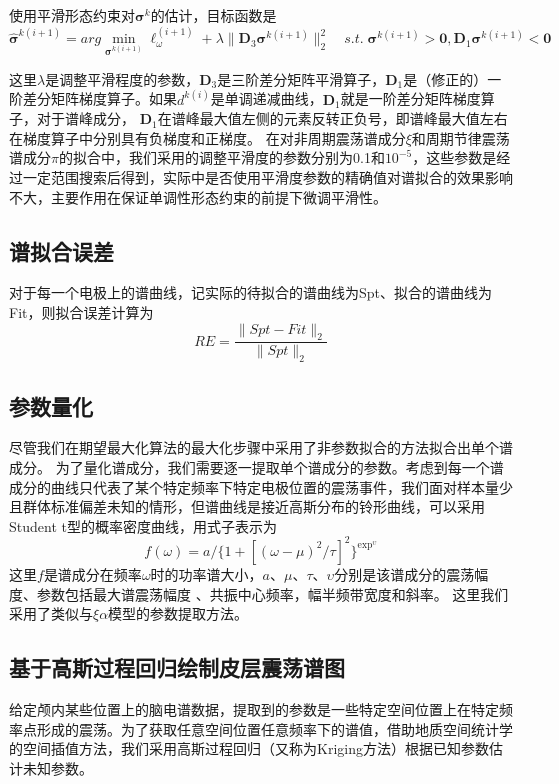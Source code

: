 使用平滑形态约束对$\mathbf{\sigma}^k$的估计，目标函数是
\begin{equation}\label{eq12}
\hat{\mathbf{\sigma}}^{k(i+1)}=arg\min_{\mathbf{\sigma}^{k(i+1)}}\ell_\omega^{(i+1)}+\lambda\lVert\mathbf{D}_3\mathbf{\sigma}^{k(i+1)}\rVert_2^2\quad
s.t.\;\mathbf{\sigma}^{k(i+1)}>\mathbf{0},\mathbf{D}_1\mathbf{\sigma}^{k(i+1)}<\mathbf{0}
\end{equation}

这里$\lambda$是调整平滑程度的参数，$\mathbf{D}_3$是三阶差分矩阵平滑算子，$\mathbf{D}_1$是（修正的）一阶差分矩阵梯度算子。如果$d^{k(i)}$是单调递减曲线，$\mathbf{D}_1$就是一阶差分矩阵梯度算子，对于谱峰成分，
$\mathbf{D}_1$在谱峰最大值左侧的元素反转正负号，即谱峰最大值左右在梯度算子中分别具有负梯度和正梯度。 在对非周期震荡谱成分$\xi$和周期节律震荡谱成分$\pi$的拟合中，我们采用的调整平滑度的参数分别为0.1和$10^{-5}$，这些参数是经过一定范围搜索后得到，实际中是否使用平滑度参数的精确值对谱拟合的效果影响不大，主要作用在保证单调性形态约束的前提下微调平滑性。

\subsection{谱拟合误差}
对于每一个电极上的谱曲线，记实际的待拟合的谱曲线为Spt、拟合的谱曲线为Fit，则拟合误差计算为
\begin{equation}\label{eq13}
RE = \frac{\lVert{Spt-Fit}\rVert_2}{\lVert{Spt}\rVert_2}
\end{equation}

\subsection{参数量化}
尽管我们在期望最大化算法的最大化步骤中采用了非参数拟合的方法拟合出单个谱成分。 为了量化谱成分，我们需要逐一提取单个谱成分的参数。考虑到每一个谱成分的曲线只代表了某个特定频率下特定电极位置的震荡事件，我们面对样本量少且群体标准偏差未知的情形，但谱曲线是接近高斯分布的铃形曲线，可以采用Student t型的概率密度曲线，用式子表示为
\begin{equation}\label{eq14}
f(\omega)=a/\lbrace1+[(\omega-\mu)^2/\tau]^2\rbrace^{\exp^\upsilon}
\end{equation}
这里$f$是谱成分在频率$\omega$时的功率谱大小，$a$、$\mu$、$\tau$、$\upsilon$分别是该谱成分的震荡幅度、参数包括最大谱震荡幅度
、共振中心频率，幅半频带宽度和斜率。 这里我们采用了类似与$\xi\alpha$模型的参数提取方法。

\subsection{基于高斯过程回归绘制皮层震荡谱图}\label{ch:kriging}
给定颅内某些位置上的脑电谱数据，提取到的参数是一些特定空间位置上在特定频率点形成的震荡。为了获取任意空间位置任意频率下的谱值，借助地质空间统计学的空间插值方法，我们采用高斯过程回归（又称为Kriging方法）根据已知参数估计未知参数。

